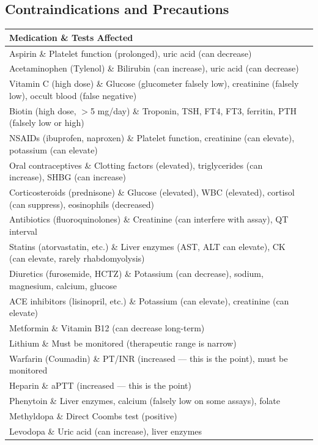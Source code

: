 \subsection{Contraindications and Precautions}

\begin{longtable}{@{}ll@{}}
\toprule
\textbf{Medication} \& \textbf{Tests Affected} \\
\midrule
Aspirin \& Platelet function (prolonged), uric acid (can decrease) \\
Acetaminophen (Tylenol) \& Bilirubin (can increase), uric acid (can decrease) \\
Vitamin C (high dose) \& Glucose (glucometer falsely low), creatinine (falsely low), occult blood (false negative) \\
Biotin (high dose, $>$5 mg/day) \& Troponin, TSH, FT4, FT3, ferritin, PTH (falsely low or high) \\
NSAIDs (ibuprofen, naproxen) \& Platelet function, creatinine (can elevate), potassium (can elevate) \\
Oral contraceptives \& Clotting factors (elevated), triglycerides (can increase), SHBG (can increase) \\
Corticosteroids (prednisone) \& Glucose (elevated), WBC (elevated), cortisol (can suppress), eosinophils (decreased) \\
Antibiotics (fluoroquinolones) \& Creatinine (can interfere with assay), QT interval \\
Statins (atorvastatin, etc.) \& Liver enzymes (AST, ALT can elevate), CK (can elevate, rarely rhabdomyolysis) \\
Diuretics (furosemide, HCTZ) \& Potassium (can decrease), sodium, magnesium, calcium, glucose \\
ACE inhibitors (lisinopril, etc.) \& Potassium (can elevate), creatinine (can elevate) \\
Metformin \& Vitamin B12 (can decrease long-term) \\
Lithium \& Must be monitored (therapeutic range is narrow) \\
Warfarin (Coumadin) \& PT/INR (increased --- this is the point), must be monitored \\
Heparin \& aPTT (increased --- this is the point) \\
Phenytoin \& Liver enzymes, calcium (falsely low on some assays), folate \\
Methyldopa \& Direct Coombs test (positive) \\
Levodopa \& Uric acid (can increase), liver enzymes \\
\bottomrule
\end{longtable}

